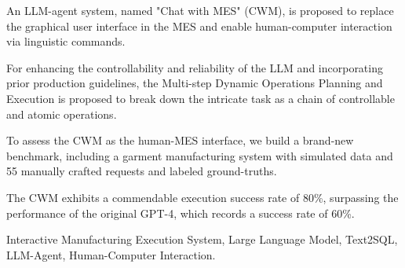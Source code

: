 \documentclass[preprint,12pt]{elsarticle}
\begin{document}
\begin{frontmatter}
\begin{highlights}
\item An LLM-agent system, named "Chat with MES" (CWM), is proposed to replace the graphical user interface in the MES and enable human-computer interaction via linguistic commands.
\item 
For enhancing the controllability and reliability of the LLM and incorporating prior production guidelines,
the Multi-step Dynamic Operations Planning and Execution is proposed to break down the intricate task as a chain of controllable and atomic operations.
\item 
To assess the CWM as the human-MES interface, 
we build a brand-new benchmark, including a garment manufacturing system with simulated data and 55 manually crafted requests and labeled ground-truths.
\item The CWM exhibits a commendable execution success rate of 80\%, surpassing the performance of the original GPT-4, which records a success rate of 60\%.

\end{highlights}

\begin{keyword}
Interactive Manufacturing Execution System, Large Language Model, Text2SQL, LLM-Agent, Human-Computer Interaction.



\end{keyword}

\end{frontmatter}

\end{document}
